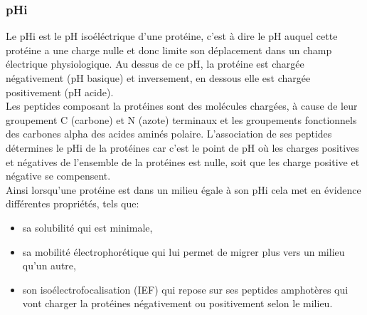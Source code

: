 \subsubsection*{pHi}
Le pHi est le pH isoéléctrique d'une protéine, c'est à dire le pH auquel cette protéine a une charge nulle et donc limite son déplacement dans un champ électrique physiologique.
Au dessus de ce pH, la protéine est chargée négativement (pH basique) et inversement, en dessous elle est chargée positivement (pH acide).\\
Les peptides composant la protéines sont des molécules chargées, à cause de leur groupement C (carbone) et N (azote) terminaux et les groupements fonctionnels des carbones alpha des acides aminés polaire. L'association de ses peptides détermines le pHi de la protéines car c'est le point de pH où les charges positives et négatives de l'ensemble de la protéines est nulle, soit que les charge positive et négative se compensent.\\
Ainsi lorsqu'une protéine est dans un milieu égale à son pHi cela met en évidence différentes propriétés, tels que:
\begin{itemize}
\item sa solubilité qui est minimale,
\item sa mobilité électrophorétique qui lui permet de migrer plus vers un milieu qu'un autre,
\item son isoélectrofocalisation (IEF) qui repose sur ses peptides amphotères qui vont charger la protéines négativement ou positivement selon le milieu.
\end{itemize}



